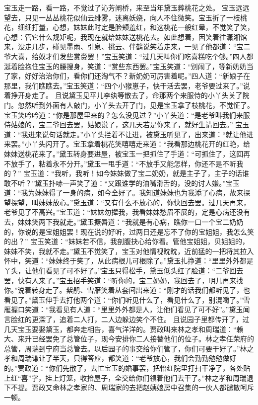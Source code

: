 \documentclass[12pt,oneside]{book}
\begin{document}
宝玉走一路，看一路，不觉过了沁芳闸桥，来至当年黛玉葬桃花之处。
宝玉远远望去，只见一丛丛桃花似仙云绯雾，迷离妖娆，向人不住微笑。宝玉折了一枝桃花，细细打量，心想，妹妹此时定是脸颊羞红，和这桃花一般红晕，不觉笑了笑，心想：管它什么规矩呢，我现在就给妹妹送桃花去。如此想着，因笑着往潇湘馆来，没走几步，碰见墨雨、引泉、挑云、伴鹤说笑着走来，一见了他都道：“宝二爷大喜，给奴才们发些赏赍罢！”宝玉笑道：“过几天叫你们吃喜糕吃个够。”四人都涎着脸抱住宝玉的腰搜身，笑道：“赏些东西罢。”宝玉笑道：“别闹了，等新奶奶当了家，好好治治你们，看你们还淘气不？新奶奶可厉害着呢。”四人道：“新娘子在那里，我们瞧瞧去。”宝玉笑道：“四个小猴崽子，快干活去罢，老爷要过来了。”说着挣开身走了。
且说黛玉见平儿李纨等散去了，命那两个来服侍的小丫头关了院门。忽然听到外面有人敲门，小丫头去开了门，见是宝玉拿了枝桃花，不觉怔了。宝玉笑吟吟道：“你是那屋里来的？怎么没见过？”小丫头道：“是老爷叫我们来服侍姑娘的，宝二爷回去罢，姑娘说了，这几天若是你来了，就好生请回去。”
宝玉道：“我进来说句话就走。”小丫头拦着不让进，被黛玉听见了，出来道：“就让他进来罢。”小丫头闪开了。宝玉拿着桃花笑嘻嘻走来道：“我看那边桃花开的红艳，给妹妹送桃花来了。”黛玉转身要进屋，被宝玉一把抓住了手道：“可抓住了，这回再不放手了，粘着永不分开。”黛玉一甩手道：“不放手又能怎样，你还不是不听我的？”
宝玉道：“我听，我听！如今妹妹做了宝二奶奶，就是主子了，主子的话谁敢不听？”黛玉扑哧一声笑了道：“又跟谁学的油嘴滑舌的，没的讨人嫌。”宝玉道：“我为妹妹得了一身的病，如今全好了。我知道妹妹也为我添了心病，故来探望探望，叫妹妹放心。”黛玉道：“又有什么不放心的，你快回去罢。过几天再来，老爷见了不高兴。”宝玉道：“妹妹勿撵我，我看妹妹愁眉不展的，定是心病还没有去，妹妹笑两下我就走。”黛玉撅唇道：“我就是有心病，瞧你一口一个宝二奶奶的，你说的是宝姐姐罢！现在说的好听，过两日还是忘不了你的宝姐姐，我怎么笑的出？”
宝玉笑道：“妹妹若不信，我剖腹抉心给你看。管他宝姐姐，贝姐姐的，妹妹不笑，我就不走。”黛玉不觉笑了，宝玉对他情视眈眈，近前猛的一把将其拉入怀中，笑道：“妹妹终于笑了，从此病根儿可根除了。”黛玉扎挣道：“里里外外都是丫头，让他们看见了可不好了。”宝玉只得松手，黛玉低头红了脸道：“二爷回去罢，快有人来了。”宝玉招手笑道：“听你的，宝二奶奶，我回去了，明儿再来找你。”说着转身走了。紫鹃、雪雁笑着从套间出来道：“刚才的话我们都听见了，也看见了。”黛玉伸手去打他两个道：“你们听见什么了，看见什么了，别混嚼了。”雪雁握口笑道：“我看见有人道：“里里外外都是人，让他们看见了可不好”。”黛玉闻言脸红的更深了，追着二人打，二人边躲边笑个不住。
且说园子里都传开了，过几天宝玉要娶黛玉，都奔走相告，喜气洋洋的。贾政叫来林之孝和周瑞道：“赖大、来升已经罢免了总管位子，现今安排你二人接替他们的位子。林之孝任荣府的总管，周瑞到宁府当总管去。以后园子的事交给你们管了，你们可要干好了。”林之孝和周瑞谦让了半天，只得答应，都笑道：“老爷放心，我们会勤勤勉勉做好的。”贾政道：“你们先散了，去忙宝玉的婚事罢，把怡红院里打扫干净了，各处贴上红“喜”字，挂上灯笼，收拾屋子，全交给你们领着他们去干了。”林之孝和周瑞退下不提。贾政又命林之孝家的、周瑞家的去把赵姨娘房中召集的一伙人都谴散呵斥一顿。
\end{document}
